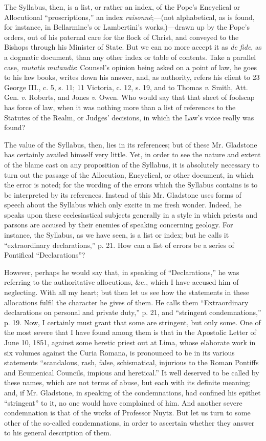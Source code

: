 The Syllabus, then, is a list, or rather an index, of the Pope's
Encyclical or Allocutional ``proscriptions,'' an index \emph{raisonné};—(not
alphabetical, as is found, for instance, in Bellarmine's or Lambertini's
works,)—drawn up by the Pope's orders, out of his paternal care for
the flock of Christ, and conveyed to the Bishops through his Minister of
State. But we can no more accept it as \emph{de fide}, as a dogmatic
document, than any other index or table of contents. Take a parallel
case, \emph{mutatis mutandis}: Counsel's opinion being asked on a point
of law, he goes to his law books, writes down his answer, and, as
authority, refers his client to 23 George III., c. 5, s. 11; 11
Victoria, c. 12, s. 19, and to Thomas \emph{v}. Smith, Att. Gen. \emph{v}.
Roberts, and Jones \emph{v}. Owen. Who would say that that sheet of
foolscap has force of law, when it was nothing more than a list of
references to the Statutes of the Realm, or Judges' decisions, in which
the Law's voice really was found?

The value of the Syllabus, then, lies in its references; but of these
Mr. Gladstone has certainly availed himself very little. Yet, in order
to see the nature and extent of the blame cast on any proposition of the
Syllabus, it is absolutely necessary to turn out the passage of the
Allocution, Encyclical, or other document, in which the error is
noted; for the wording of the errors which the Syllabus contains is to
be interpreted by its references. Instead of this Mr. Gladstone uses
forms of speech about the Syllabus which only excite in me fresh wonder.
Indeed, he speaks upon these ecclesiastical subjects generally in a
style in which priests and parsons are accused by their enemies of
speaking concerning geology. For instance, the Syllabus, as we have
seen, is a list or index; but he calls it ``extraordinary
declarations,'' p. 21. How can a list of errors be a series of
Pontifical ``Declarations''?

However, perhaps he would say that, in speaking of
``Declarations,'' he was referring to the authoritative
allocutions, \&c., which I have accused him of neglecting. With all
my heart; but then let us see how the statements in these allocations
fulfil the character he gives of them. He calls them ``Extraordinary
declarations on personal and private duty,'' p. 21, and
``stringent condemnations,'' p. 19. Now, I certainly must grant
that some are stringent, but only some. One of the most severe that I
have found among them is that in the Apostolic Letter of June 10, 1851,
against some heretic priest out at Lima, whose elaborate work in six
volumes against the Curia Romana, is pronounced to be in its various
statements ``scandalous, rash, false, schismatical, injurious to the
Roman Pontiffs and Ecumenical Councils, impious and heretical.'' It
well deserved to be called by these names, which are not terms of abuse,
but each with its definite meaning; and, if Mr. Gladstone, in speaking
of the condemnations, had confined his epithet ``stringent'' to
it, no one would have complained of him. And another severe
condemnation is that of the works of Professor Nuytz. But let us turn to
some other of the so-called condemnations, in order to ascertain whether
they answer to his general description of them.

